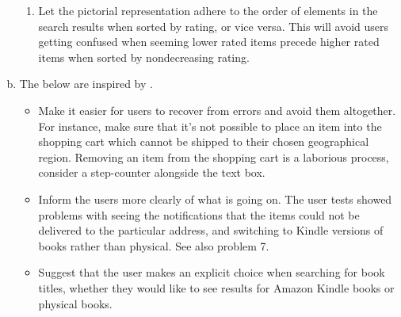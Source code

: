 \begin{enumerate}[a.]
\begin{enumerate}[1.]
\item Let the pictorial representation adhere to the order of elements in the
search results when sorted by rating, or vice versa. This will avoid users
getting confused when seeming lower rated items precede higher rated items when
sorted by nondecreasing rating.

\end{enumerate}

\item The below are inspired by \cite[\textsection\ 1]{hearst}.

\begin{itemize}

\item Make it easier for users to recover from errors and avoid them
altogether. For instance, make sure that it's not possible to place an item
into the shopping cart which cannot be shipped to their chosen geographical
region. Removing an item from the shopping cart is a laborious process,
consider a step-counter alongside the text box.

\item Inform the users more clearly of what is going on. The user tests showed
problems with seeing the notifications that the items could not be delivered to
the particular address, and switching to Kindle versions of books rather than
physical. See also problem 7.

\item Suggest that the user makes an explicit choice when searching for book
titles, whether they would like to see results for Amazon Kindle books or
physical books.

\end{itemize}

\end{enumerate}

